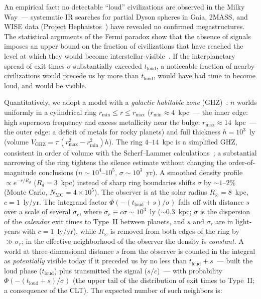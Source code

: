 \documentclass[11pt,a4paper]{article}
\begin{document}
An empirical fact: no detectable ``loud'' civilizations are observed in the Milky Way~--- systematic IR searches for partial Dyson spheres in Gaia, 2MASS, and WISE data (Project Hephaistos~\cite{Suazo2024}) have revealed no confirmed megastructures. The statistical arguments of the Fermi paradox show that the absence of signals imposes an upper bound on the fraction of civilizations that have reached the level at which they would become interstellar-visible~\cite{Wright2014,Hanson2021}. If the interplanetary spread of exit times $\sigma$ substantially exceeded $t_{\mathrm{loud}}$, a noticeable fraction of nearby civilizations would precede us by more than $t_{\mathrm{loud}}$, would have had time to become loud, and would be visible.

Quantitatively, we adopt a model with a \emph{galactic habitable zone} (GHZ)~\cite{Lineweaver2001,Scherf2024}: $n$ worlds uniformly in a cylindrical ring $r_{\min}\le r\le r_{\max}$ ($r_{\min}\approx4$~kpc~--- the inner edge: high supernova frequency and excess metallicity near the bulge; $r_{\max}\approx14$~kpc~--- the outer edge: a deficit of metals for rocky planets) and full thickness $h = 10^3$~ly (volume $V_{\mathrm{GHZ}} = \pi(r_{\max}^2-r_{\min}^2)h$). The ring $4$--$14$~kpc is a simplified GHZ, consistent in order of volume with the Scherf--Lammer calculations~\cite{Scherf2024}; a substantial narrowing of the ring tightens the silence estimate without changing the order-of-magnitude conclusions ($n\sim10^4$--$10^5$, $\sigma\sim10^3$~yr). A smoothed density profile $\propto e^{-r/R_d}$ ($R_d=3$~kpc) instead of sharp ring boundaries shifts $\sigma$ by $\sim1$--$2\%$ (Monte Carlo, $N_{\mathrm{MC}}=4\times10^5$). The observer is at the solar radius $R_\odot=8$~kpc, $c = 1$~ly/yr. The integrand factor $\Phi(-(t_{\mathrm{loud}}+s)/\sigma)$ falls off with distance $s$ over a scale of several $\sigma_r$, where $\sigma_r\equiv c\sigma\sim10^3$~ly ($\sim0.3$~kpc; $\sigma$ is the dispersion of the \emph{calendar} exit times to Type~II between planets, and $s$ and $\sigma_r$ are in light-years with $c=1$~ly/yr), while $R_\odot$ is removed from both edges of the ring by $\gg\sigma_r$; in the effective neighborhood of the observer the density is \emph{constant}. A world at three-dimensional distance $s$ from the observer is counted in the integral as \emph{potentially} visible today if it preceded us by no less than $t_{\mathrm{loud}} + s$~--- built the loud phase ($t_{\mathrm{loud}}$) plus transmitted the signal ($s/c$)~--- with probability $\Phi(-(t_{\mathrm{loud}}+s)/\sigma)$ (the upper tail of the distribution of exit times to Type~II; a consequence of the CLT). The expected number of such neighbors is:
\end{document}
